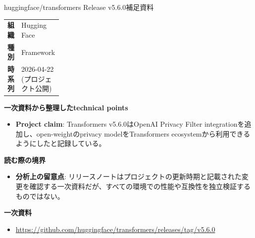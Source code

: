 \begin{technicalnote}{huggingface/transformers Release v5.6.0}{補足資料}
\begingroup
\begin{tabularx}{\linewidth}{@{}>{\bfseries}p{0.22\linewidth}X@{}}
組織 & Hugging Face \\
種別 & Framework \\
時系列 & 2026-04-22 (プロジェクト公開) \\
\end{tabularx}
\smallskip
{\bfseries 一次資料から整理したtechnical points}
\begin{itemize}[leftmargin=1.5em,itemsep=0.35em]
\item \textbf{Project claim}: Transformers v5.6.0はOpenAI Privacy Filter integrationを追加し、open-weightのprivacy modelをTransformers ecosystemから利用できるようにしたと記録している。
\end{itemize}
{\bfseries 読む際の境界}
\begin{itemize}[leftmargin=1.5em,itemsep=0.35em]
\item \textbf{分析上の留意点}: リリースノートはプロジェクトの更新時期と記載された変更を確認する一次資料だが、すべての環境での性能や互換性を独立検証するものではない。
\end{itemize}
\begin{samepage}
{\bfseries 一次資料}
\begingroup\sloppy
\begin{itemize}[leftmargin=1.5em,itemsep=0.25em]
\item {\scriptsize\url{https://github.com/huggingface/transformers/releases/tag/v5.6.0}}
\end{itemize}
\endgroup
\end{samepage}
\endgroup
\end{technicalnote}
\medskip

